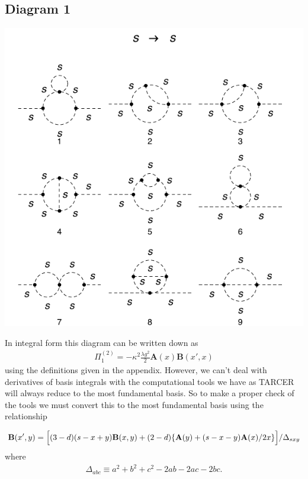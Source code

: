 \documentclass[11pt]{article}
\begin{document}
\subsection*{Diagram 1}
\noindent\begin{minipage}{0.3\textwidth}
\begin{center}
\includegraphics{2loop_1.pdf}\\
\end{center}
\end{minipage}
\noindent\begin{minipage}{0.7\textwidth}
In integral form this diagram can be written down as
\begin{align}
\Pi^{(2)}_1=-\kappa^2\frac{\lambda g^2}{2}\mathbf{A}(x)\mathbf{B}(x',x)\label{eqn:scalar_2a}
\end{align}
using the definitions given in the appendix.  However, we can't deal with derivatives of basis integrals with the computational tools we have as TARCER will always reduce to the most fundamental basis.  So to make a proper check of the tools we must convert this to the most fundamental basis using the relationship
\end{minipage}
\begin{align}
{\bf B}(x',y) = 
\Bigl [ (3-d) (s-x+y) {\bf B}(x,y) + (2-d) \lbrace 
{\bf A}(y) 
+ (s-x-y){\bf A}(x)/2x \rbrace \Bigr ]/\Delta_{sxy} \label{eqn:deltaxyz}
\end{align}
where
\begin{align}
\Delta_{abc} \equiv a^2 + b^2 + c^2 - 2 a b - 2 a c - 2 b c.
\end{align}
\end{document}
